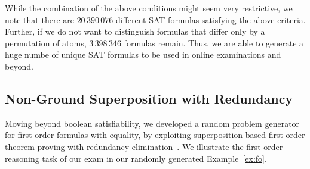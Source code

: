 While the combination of the above conditions might seem very restrictive,
we note that 
there are $20\,390\,076$ different SAT formulas satisfying the above
criteria. Further, 
if we do not want to distinguish formulas that differ only by a permutation of atoms,
$3\,398\,346$ formulas remain. Thus, we are able to generate a huge
numbe of unique SAT formulas to be used in online examinations and
beyond.



\subsection{Non-Ground Superposition with Redundancy}\label{sec:fo}

Moving beyond boolean satisfiability, we developed a random problem
generator for first-order formulas with equality, by exploiting
superposition-based first-order theorem proving with redundancy elimination~\cite{Rubio01,Vampire13}.
We illustrate the first-order reasoning task of our
exam in our randomly generated Example~\ref{ex:fo}. 


